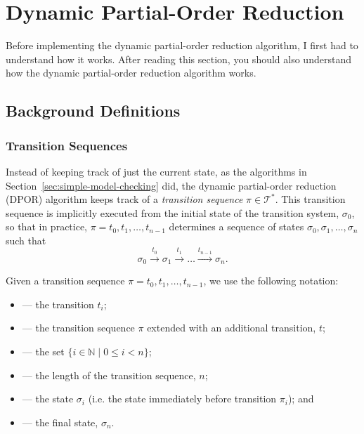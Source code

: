 \documentclass[12pt,a4paper,twoside,openright]{report}
\begin{document}
\section{Dynamic Partial-Order Reduction}
\label{sec:dpor-prep}
Before implementing the dynamic partial-order
reduction algorithm, I first had to
understand how it works.
After reading this section, you should
also understand how the dynamic
partial-order reduction algorithm works.

\subsection{Background Definitions}

\subsubsection{Transition Sequences}
Instead of keeping track of just the current state, as
the algorithms in Section~\ref{sec:simple-model-checking}
did, the dynamic partial-order reduction (DPOR) algorithm
keeps track of a \emph{transition
sequence} $\pi \in \mathcal{T}^*$. This transition
sequence is implicitly executed from the initial state of
the transition system, $\sigma_0$, so that in practice,
$\pi = t_0, t_1, \ldots, t_{n-1}$ determines a sequence of states
$\sigma_0, \sigma_1, \ldots, \sigma_n$ such that
\[
	\sigma_0 \xrightarrow{\ t_0\ } \sigma_1 \xrightarrow{\ t_1\ }
	\ldots \xrightarrow{t_{n-1}} \sigma_n.
\]

Given a transition sequence $\pi = t_0, t_1, \ldots, t_{n-1}$,
we use the following notation:
\begin{itemize}[label={}]
	\newcommand{\defsindent}{3.5em}
	\item{\makebox[\defsindent]{\hfill$\pi_i$}
		--- the transition $t_i$;}
	\item{\makebox[\defsindent]{\hfill$\pi.t$}
		--- the transition sequence $\pi$ extended with
		an additional transition, $t$;}
	\item{\makebox[\defsindent]{\hfill$\textit{dom}(\pi)$}
		--- the set $\{i \in \mathbb{N} \mid 0 \leq i < n \}$;}
	\item{\makebox[\defsindent]{\hfill$|\pi|$}
		--- the length of the transition sequence, $n$;}
	\item{\makebox[\defsindent]{\hfill$\textit{pre}(\pi, i)$}
		--- the state $\sigma_i$ (i.e. the
		state immediately before transition $\pi_i$); and}
	\item{\makebox[\defsindent]{\hfill$\textit{last}(\pi)$}
		--- the final state, $\sigma_n$.}
\end{itemize}
\end{document}
